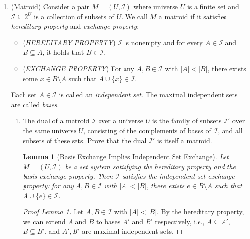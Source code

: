 \documentclass[12pt,a4paper]{article}
\newtheorem{lemma}[theorem]{Lemma}
\theoremstyle{definition}
\begin{document}
\begin{enumerate}
\begin{enumerate}
\begin{proof}
            Repeating the argument, we can transform the optimal solution into the greedy solution without increasing the number of intervals. Hence the greedy solution uses at most the same number of intervals as any optimal solution, i.e., it is optimal. This contradicts the assumption that greedy is not optimal.
        \end{proof}
\end{enumerate}



  \item {\color{purple} (Matroid)} Consider a pair $M = (U, \mathcal{I})$ where universe $U$ is a finite set and $\mathcal{I}
    \subseteq 2^U$ is a collection of subsets of $U$. We call $M$ a
    matroid if it satisfies \emph{hereditary property} and
    \emph{exchange property}:
    \begin{itemize}
      \item (\emph{HEREDITARY PROPERTY}) $\mathcal{I}$ is nonempty
        and for every $A \in \mathcal{I}$ and $B \subseteq A$, it
        holds that $B \in \mathcal{I}$.
      \item (\emph{EXCHANGE PROPERTY}) For any $A, B \in
        \mathcal{I}$ with $|A| < |B|$, there
        exists some $x \in B \setminus A$ such that $A \cup \{x\} \in
        \mathcal{I}$.
    \end{itemize}
    Each set $A \in \mathcal{I}$ is called an \emph{independent set}. The maximal independent sets are called \emph{bases}.
    \begin{enumerate}
      \item The dual of a matroid $\mathcal{I}$ over a universe $U$ is the family of subsets $\mathcal{I}'$ over the same universe $U$, consisting of the complements of bases of $\mathcal{I}$, and all subsets of these sets. Prove that the dual $\mathcal{I}'$ is itself a matroid.



        \begin{lemma}[Basis Exchange Implies Independent Set Exchange]
        Let $M = (U, \mathcal{I})$ be a set system satisfying the hereditary property and the basis exchange property. Then $\mathcal{I}$ satisfies the independent set exchange property: for any $A, B \in \mathcal{I}$ with $|A| < |B|$, there exists $e \in B \setminus A$ such that $A \cup \{e\} \in \mathcal{I}$.
        \end{lemma}
        
        \begin{proof}[Proof Lemma 1]
            Let $A, B \in \mathcal{I}$ with $|A| < |B|$. By the hereditary property, we can extend $A$ and $B$ to bases $A'$ and $B'$ respectively, i.e., $A \subseteq A'$, $B \subseteq B'$, and $A', B'$ are maximal independent sets. 
        

\end{proof}
\end{enumerate}
\end{enumerate}
\end{document}
